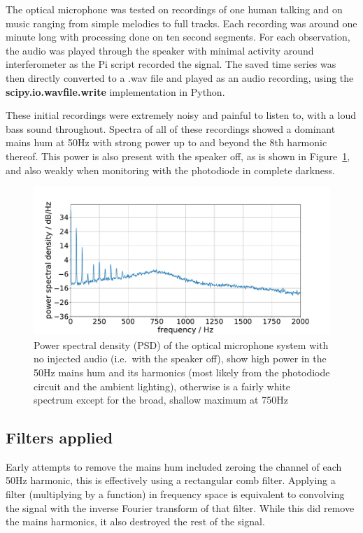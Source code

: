 \documentclass[prb,preprint]{revtex4-1}
\begin{document}
The optical microphone was tested on recordings of one human talking and on music ranging from simple melodies to full tracks. Each recording was around one minute long with processing done on ten second segments. For each observation, the audio was played through the speaker with minimal activity around interferometer as the Pi script recorded the signal. The saved time series was then directly converted to a .wav file and played as an audio recording, using the \textbf{scipy.io.wavfile.write}\cite{scipy} implementation in Python\cite{python}.


These initial recordings were extremely noisy and painful to listen to, with a loud bass sound throughout. Spectra of all of these recordings showed a dominant mains hum at 50Hz with strong power up to and beyond the 8th harmonic thereof. This power is also present with the speaker off, as is shown in Figure~\ref{fig:psd_noise}, and also weakly when monitoring with the photodiode in complete darkness.

\begin{figure}%
	\includegraphics[width=\textwidth]{figures/podo_noise_psd_zoom-cropped.pdf}
	\caption{Power spectral density (PSD) of the optical microphone system with no injected audio (i.e.\ with the speaker off), show high power in the 50Hz mains hum and its harmonics (most likely from the photodiode circuit and the ambient lighting), otherwise is a fairly white spectrum except for the broad, shallow maximum at 750Hz}
	\label{fig:psd_noise}
\end{figure}

\subsection{Filters applied}

Early attempts to remove the mains hum included zeroing the channel of each 50Hz harmonic, this is effectively using a rectangular comb filter. Applying a filter (multiplying by a function) in frequency space is equivalent to convolving the signal with the inverse Fourier transform of that filter. While this did remove the mains harmonics, it also destroyed the rest of the signal.
\end{document}
